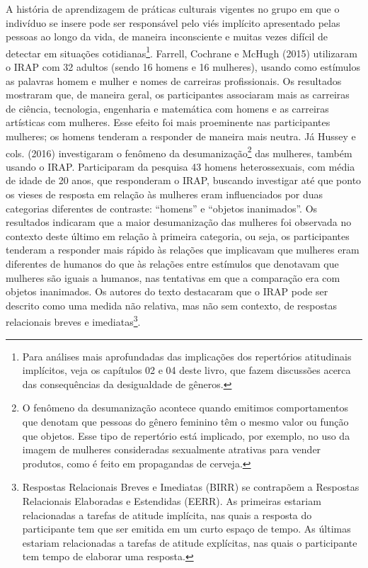 A história de aprendizagem de práticas culturais vigentes no grupo em que o indivíduo se insere pode ser responsável pelo viés implícito apresentado pelas pessoas ao longo da vida, de maneira inconsciente e muitas vezes difícil de detectar em situações cotidianas\footnote{Para análises mais aprofundadas das implicações dos repertórios atitudinais implícitos, veja os capítulos 02 e 04 deste livro, que fazem discussões acerca das consequências da desigualdade de gêneros.}. Farrell, Cochrane e McHugh (2015) utilizaram o IRAP com 32 adultos (sendo 16 homens e 16 mulheres), usando como estímulos as palavras homem e mulher e nomes de carreiras profissionais. Os resultados mostraram que, de maneira geral, os participantes associaram mais as carreiras de ciência, tecnologia, engenharia e matemática com homens e as carreiras artísticas com mulheres. Esse efeito foi mais proeminente nas participantes mulheres; os homens tenderam a responder de maneira mais neutra. Já Hussey e cols. (2016) investigaram o fenômeno da desumanização\footnote{O fenômeno da desumanização acontece quando emitimos comportamentos que denotam que pessoas do gênero feminino têm o mesmo valor ou função que objetos. Esse tipo de repertório está implicado, por exemplo, no uso da imagem de mulheres consideradas sexualmente atrativas para vender produtos, como é feito em propagandas de cerveja.} das mulheres, também usando o IRAP. Participaram da pesquisa 43 homens heterossexuais, com média de idade de 20 anos, que responderam o IRAP, buscando investigar até que ponto os vieses de resposta em relação às mulheres eram influenciados por duas categorias diferentes de contraste: ``homens'' e ``objetos inanimados''. Os resultados indicaram que a maior desumanização das mulheres foi observada no contexto deste último em relação à primeira categoria, ou seja, os participantes tenderam a responder mais rápido às relações que implicavam que mulheres eram diferentes de humanos do que às relações entre estímulos que denotavam que mulheres são iguais a humanos, nas tentativas em que a comparação era com objetos inanimados. Os autores do texto destacaram que o IRAP pode ser descrito como uma medida não relativa, mas não sem contexto, de respostas relacionais breves e imediatas\footnote{Respostas Relacionais Breves e Imediatas (BIRR) se contrapõem a Respostas Relacionais Elaboradas e Estendidas (EERR). As primeiras estariam relacionadas a tarefas de atitude implícita, nas quais a resposta do participante tem que ser emitida em um curto espaço de tempo. As últimas estariam relacionadas a tarefas de atitude explícitas, nas quais o participante tem tempo de elaborar uma resposta.}. 

